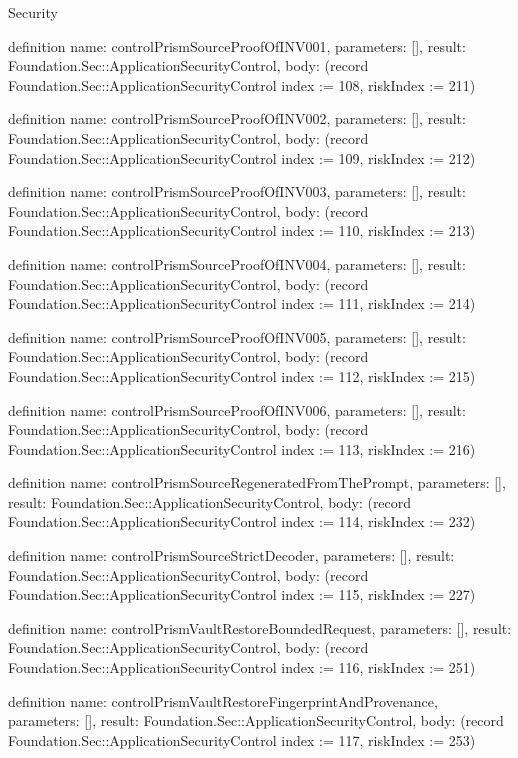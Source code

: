 \begin{lexlean}{Security}
\begin{semanticmodule}
definition{
  name: controlPrismSourceProofOfINV001,
  parameters: [],
  result: Foundation.Sec::ApplicationSecurityControl,
  body: (record Foundation.Sec::ApplicationSecurityControl {index := 108, riskIndex := 211})
}

definition{
  name: controlPrismSourceProofOfINV002,
  parameters: [],
  result: Foundation.Sec::ApplicationSecurityControl,
  body: (record Foundation.Sec::ApplicationSecurityControl {index := 109, riskIndex := 212})
}

definition{
  name: controlPrismSourceProofOfINV003,
  parameters: [],
  result: Foundation.Sec::ApplicationSecurityControl,
  body: (record Foundation.Sec::ApplicationSecurityControl {index := 110, riskIndex := 213})
}

definition{
  name: controlPrismSourceProofOfINV004,
  parameters: [],
  result: Foundation.Sec::ApplicationSecurityControl,
  body: (record Foundation.Sec::ApplicationSecurityControl {index := 111, riskIndex := 214})
}

definition{
  name: controlPrismSourceProofOfINV005,
  parameters: [],
  result: Foundation.Sec::ApplicationSecurityControl,
  body: (record Foundation.Sec::ApplicationSecurityControl {index := 112, riskIndex := 215})
}

definition{
  name: controlPrismSourceProofOfINV006,
  parameters: [],
  result: Foundation.Sec::ApplicationSecurityControl,
  body: (record Foundation.Sec::ApplicationSecurityControl {index := 113, riskIndex := 216})
}

definition{
  name: controlPrismSourceRegeneratedFromThePrompt,
  parameters: [],
  result: Foundation.Sec::ApplicationSecurityControl,
  body: (record Foundation.Sec::ApplicationSecurityControl {index := 114, riskIndex := 232})
}

definition{
  name: controlPrismSourceStrictDecoder,
  parameters: [],
  result: Foundation.Sec::ApplicationSecurityControl,
  body: (record Foundation.Sec::ApplicationSecurityControl {index := 115, riskIndex := 227})
}

definition{
  name: controlPrismVaultRestoreBoundedRequest,
  parameters: [],
  result: Foundation.Sec::ApplicationSecurityControl,
  body: (record Foundation.Sec::ApplicationSecurityControl {index := 116, riskIndex := 251})
}

definition{
  name: controlPrismVaultRestoreFingerprintAndProvenance,
  parameters: [],
  result: Foundation.Sec::ApplicationSecurityControl,
  body: (record Foundation.Sec::ApplicationSecurityControl {index := 117, riskIndex := 253})
}


\end{semanticmodule}
\end{lexlean}
